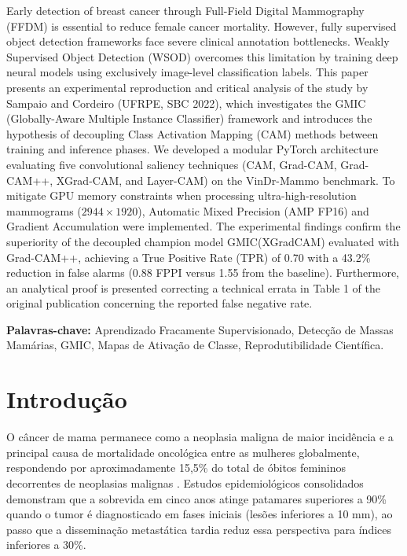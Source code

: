 \documentclass[12pt]{article}
\begin{document}
\begin{abstracten}
Early detection of breast cancer through Full-Field Digital Mammography (FFDM) is essential to reduce female cancer mortality. However, fully supervised object detection frameworks face severe clinical annotation bottlenecks. Weakly Supervised Object Detection (WSOD) overcomes this limitation by training deep neural models using exclusively image-level classification labels. This paper presents an experimental reproduction and critical analysis of the study by Sampaio and Cordeiro (UFRPE, SBC 2022), which investigates the GMIC (Globally-Aware Multiple Instance Classifier) framework and introduces the hypothesis of decoupling Class Activation Mapping (CAM) methods between training and inference phases. We developed a modular PyTorch architecture evaluating five convolutional saliency techniques (CAM, Grad-CAM, Grad-CAM++, XGrad-CAM, and Layer-CAM) on the VinDr-Mammo benchmark. To mitigate GPU memory constraints when processing ultra-high-resolution mammograms ($2944 \times 1920$), Automatic Mixed Precision (AMP FP16) and Gradient Accumulation were implemented. The experimental findings confirm the superiority of the decoupled champion model GMIC(XGradCAM) evaluated with Grad-CAM++, achieving a True Positive Rate (TPR) of 0.70 with a 43.2\% reduction in false alarms (0.88 FPPI versus 1.55 from the baseline). Furthermore, an analytical proof is presented correcting a technical errata in Table 1 of the original publication concerning the reported false negative rate.
\end{abstracten}

\noindent\textbf{Palavras-chave:} Aprendizado Fracamente Supervisionado, Detecção de Massas Mamárias, GMIC, Mapas de Ativação de Classe, Reprodutibilidade Científica.

\section{Introdução}

O câncer de mama permanece como a neoplasia maligna de maior incidência e a principal causa de mortalidade oncológica entre as mulheres globalmente, respondendo por aproximadamente 15,5\% do total de óbitos femininos decorrentes de neoplasias malignas \cite{who2023breast}. Estudos epidemiológicos consolidados demonstram que a sobrevida em cinco anos atinge patamares superiores a 90\% quando o tumor é diagnosticado em fases iniciais (lesões inferiores a 10 mm), ao passo que a disseminação metastática tardia reduz essa perspectiva para índices inferiores a 30\%.
\end{document}
